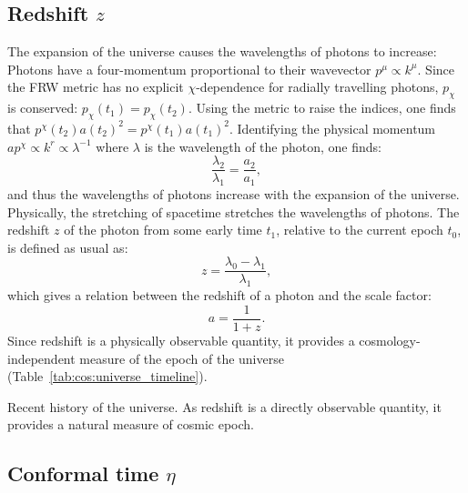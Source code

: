 \subsection{Redshift \(z\)}
The expansion of the universe causes the wavelengths of photons to increase: Photons have a four-momentum proportional to their wavevector \(p^\mu \propto k^\mu\). Since the FRW metric has no explicit \(\chi\)-dependence for radially travelling photons, \(p_\chi\) is conserved: \(p_\chi(t_1) = p_\chi(t_2)\). Using the metric to raise the indices, one finds that \(p^\chi(t_2){a(t_2)}^2=p^\chi(t_1){a(t_1)}^2\). Identifying the physical momentum \({a p^\chi \propto k^r \propto \lambda^{-1}}\) where \(\lambda\) is the wavelength of the photon, one finds:
\begin{equation}
  \frac{\lambda_2}{\lambda_1} = \frac{a_2}{a_1},
\end{equation}
and thus the wavelengths of photons increase with the expansion of the universe. Physically, the stretching of spacetime stretches the wavelengths of photons.
The redshift \(z\) of the photon from some early time \(t_1\), relative to the current epoch \(t_0\), is defined as usual as:
\begin{equation}
  z = \frac{\lambda_0-\lambda_1}{\lambda_1},
\end{equation}
which gives a relation between the redshift of a photon and the scale factor:
\begin{equation}
  a = \frac{1}{1+z}.
\end{equation}
Since redshift is a physically observable quantity, it provides a cosmology-independent measure of the epoch of the universe (Table~\ref{tab:cos:universe_timeline}).
\begin{table}[tp]
  \centering
  
\caption{Recent history of the universe. As redshift is a directly observable quantity, it provides a natural measure of cosmic epoch.}\label{tab:cos:universe_timeline}
\end{table}

\subsection{Conformal time \(\eta\)}

